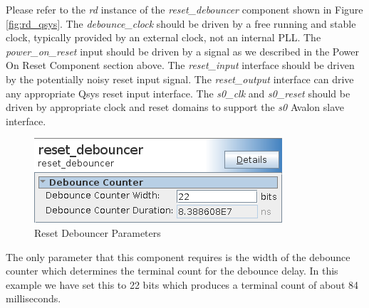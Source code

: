 \documentclass{article}
\begin{document}
\begin{flushleft}
Please refer to the \emph{rd} instance of the \emph{reset\_debouncer} component shown in Figure \ref{fig:rd_qsys}.  The \emph{debounce\_clock} should be driven by a free running and stable clock, typically provided by an external clock, not an internal PLL.  The \emph{power\_on\_reset} input should be driven by a signal as we described in the Power On Reset Component section above.  The \emph{reset\_input} interface should be driven by the potentially noisy reset input signal.  The \emph{reset\_output} interface can drive any appropriate Qsys reset input interface.  The \emph{s0\_clk} and \emph{s0\_reset} should be driven by appropriate clock and reset domains to support the \emph{s0} Avalon slave interface.

\begin{figure}[H]
\centering
\includegraphics[scale=0.675]{rd_parameters}
\caption{Reset Debouncer Parameters}
\label{fig:rd_parameters}
\end{figure}

The only parameter that this component requires is the width of the debounce counter which determines the terminal count for the debounce delay.  In this example we have set this to 22 bits which produces a terminal count of about 84 milliseconds.

\end{flushleft}

\end{document}
